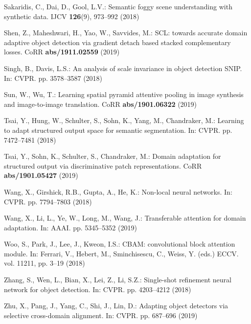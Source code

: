 \documentclass[runningheads]{llncs}
\begin{document}
\begin{thebibliography}{10}
Sakaridis, C., Dai, D., Gool, L.V.: Semantic foggy scene understanding with
  synthetic data. IJCV  \textbf{126}(9),  973--992 (2018)

Shen, Z., Maheshwari, H., Yao, W., Savvides, M.: {SCL:} towards accurate domain
  adaptive object detection via gradient detach based stacked complementary
  losses. CoRR  \textbf{abs/1911.02559} (2019)

Singh, B., Davis, L.S.: An analysis of scale invariance in object detection
  {\-} {SNIP}. In: CVPR. pp. 3578--3587 (2018)

Sun, W., Wu, T.: Learning spatial pyramid attentive pooling in image synthesis
  and image-to-image translation. CoRR  \textbf{abs/1901.06322} (2019)

Tsai, Y., Hung, W., Schulter, S., Sohn, K., Yang, M., Chandraker, M.: Learning
  to adapt structured output space for semantic segmentation. In: CVPR. pp.
  7472--7481 (2018)

Tsai, Y., Sohn, K., Schulter, S., Chandraker, M.: Domain adaptation for
  structured output via discriminative patch representations. CoRR
  \textbf{abs/1901.05427} (2019)

Wang, X., Girshick, R.B., Gupta, A., He, K.: Non-local neural networks. In:
  CVPR. pp. 7794--7803 (2018)

Wang, X., Li, L., Ye, W., Long, M., Wang, J.: Transferable attention for domain
  adaptation. In: AAAI. pp. 5345--5352 (2019)

Woo, S., Park, J., Lee, J., Kweon, I.S.: {CBAM:} convolutional block attention
  module. In: Ferrari, V., Hebert, M., Sminchisescu, C., Weiss, Y. (eds.) ECCV.
  vol. 11211, pp. 3--19 (2018)

Zhang, S., Wen, L., Bian, X., Lei, Z., Li, S.Z.: Single-shot refinement neural
  network for object detection. In: CVPR. pp. 4203--4212 (2018)

Zhu, X., Pang, J., Yang, C., Shi, J., Lin, D.: Adapting object detectors via
  selective cross-domain alignment. In: CVPR. pp. 687--696 (2019)

\end{thebibliography}
 
\end{document}

